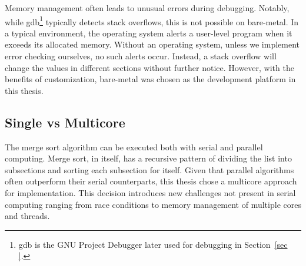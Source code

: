 Memory management often leads to unusual errors during debugging. Notably, while
gdb\footnote{gdb is the GNU Project Debugger later used for debugging in
Section~\ref{sec }.} typically detects stack overflows, this is not possible on
bare-metal. In a typical environment, the operating system alerts a user-level
program when it exceeds its allocated memory. Without an operating system,
unless we implement error checking ourselves, no such alerts occur. Instead,
a stack overflow will change the values in different sections without further
notice.
However, with the benefits of customization, bare-metal was chosen as the
development platform in this thesis.

\subsection{Single vs Multicore}\label{sec:singlevsmulti}
The merge sort algorithm can be executed both with serial and parallel
computing. Merge sort, in itself, has a recursive pattern of dividing the list
into subsections and sorting each subsection for itself. Given that parallel
algorithms often outperform their serial counterparts, this thesis chose a
multicore approach for implementation. \cite{comp_parallel} This decision
introduces new challenges not present in serial computing ranging from race
conditions to memory management of multiple cores and threads.

